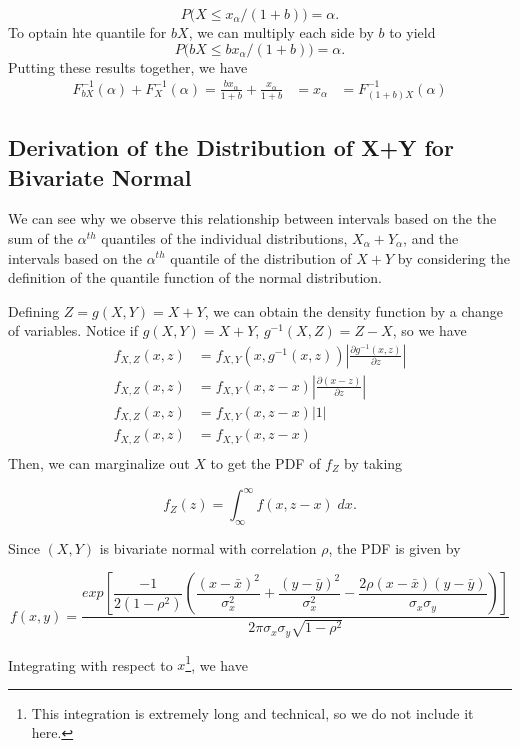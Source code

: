 \documentclass[12pt,twoside]{smiththesis}
\begin{document}
\[P\Big( X \leq x_\alpha/(1+b) \Big) = \alpha.\]
To optain hte quantile for \(bX\), we can multiply each side by \(b\) to yield
\[P\Big( bX \leq bx_\alpha/(1+b) \Big) = \alpha.\]
Putting these results together, we have
\begin{align*}
F^{-1}_{bX} (\alpha) + F^{-1}_{X} (\alpha) = \frac{bx_\alpha } { 1+b} + \frac{x_\alpha}{1+b}
&= x_\alpha 
&= F^{-1}_{(1+b)X}(\alpha) \end{align*}

\hypertarget{derivation-of-the-distribution-of-xy-for-bivariate-normal}{%
\subsection{Derivation of the Distribution of X+Y for Bivariate Normal}\label{derivation-of-the-distribution-of-xy-for-bivariate-normal}}

We can see why we observe this relationship between intervals based on the the sum of the \(\alpha^{th}\) quantiles of the individual distributions, \(X_\alpha + Y_\alpha\), and the intervals based on the \(\alpha^{th}\) quantile of the distribution of \(X+Y\) by considering the definition of the quantile function of the normal distribution.

Defining \(Z=g(X,Y) = X+Y\), we can obtain the density function by a change of variables. Notice if \(g(X,Y) = X+Y\), \(g^{-1}(X,Z) = Z-X\), so we have
\begin{align*} f_{X,Z}(x,z) &= f_{X,Y}(x,g^{-1}(x,z)) \left|\frac{\partial g^{-1}(x,z)}{\partial z}\right| \\
f_{X,Z}(x,z) &= f_{X,Y}(x,z-x) \left|\frac{\partial (x-z)}{\partial z}\right|\\
f_{X,Z}(x,z) &= f_{X,Y}(x,z-x) \left|1\right|\\
f_{X,Z}(x,z) &= f_{X,Y}(x,z-x) \\
\end{align*}
Then, we can marginalize out \(X\) to get the PDF of \(f_Z\) by taking

\[f_Z(z) = \int_{\infty}^\infty f(x,z-x) \; dx.\]

Since \((X,Y)\) is bivariate normal with correlation \(\rho\), the PDF is given by

\[f(x,y) = \dfrac{exp\left[\dfrac{-1}{2(1-\rho^2)} \left( \dfrac{(x-\bar x)^2}{\sigma_x^2}+\dfrac{(y-\bar y)^2}{\sigma_x^2} - \dfrac{2 \rho (x-\bar x)(y-\bar y)}{\sigma_x\sigma_y} \right)\right]}{2\pi \sigma_x \sigma_y \sqrt{1- \rho^2}}\]

Integrating with respect to \(x\)\footnote{This integration is extremely long and technical, so we do not include it here.}, we have
\end{document}
